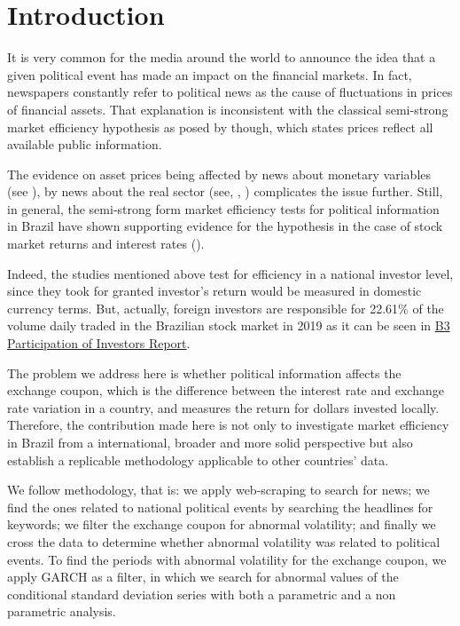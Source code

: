 \documentclass[cic,tc, english]{iiufrgs}
\begin{document}
\tableofcontents


\chapter{Introduction} \label{chapter_introduction}

    It is very common for the media around the world to announce the idea that a given political event has made an impact on the financial markets. In fact, newspapers constantly refer to political news as the cause of fluctuations in prices of financial assets. That explanation is inconsistent with the classical semi-strong market efficiency hypothesis as posed by \citet{fama1970} though, which states prices reflect all available public information.  
    
    The evidence on asset prices being affected by news about monetary variables (see \citet{cornell1983}), by news about the real sector (see, \citet{macqueenroley1993}, \citet{caporaleetal2015}) complicates the issue further. Still, in general, the semi-strong form market efficiency tests for political information in Brazil have shown supporting evidence for the hypothesis in the case of stock market returns and interest rates (\citet{marquessantos2016}).
    
    Indeed, the studies mentioned above test for efficiency in a national investor level, since they took for granted investor's return would be measured in domestic currency terms.  But, actually, foreign investors are responsible for 22.61\% of the volume daily traded in the Brazilian stock market in 2019 as it can be seen in  \href{http://www.b3.com.br/data/files/14/B4/D5/25/4B80B61070D79EA6AC094EA8/partdir_NOVOv2.xls}{B3 Participation of Investors Report}.
    
    The problem we address here is whether political information affects the exchange coupon, which is the difference between the interest rate and exchange rate variation in a country, and measures the return for dollars invested locally. Therefore, the contribution made here is not only to investigate market efficiency in Brazil from a international, broader and more solid perspective but also establish a replicable methodology applicable to other countries' data.
    
    We follow \citet{marquessantos2016} methodology, that is: we apply web-scraping to search for news; we find the ones related to national political events by searching the headlines for keywords; we filter the exchange coupon for abnormal volatility; and finally we cross the data to determine whether abnormal volatility was related to political events. To find the periods with abnormal volatility for the exchange coupon, we apply \citet{bollerslev1986} GARCH as a filter, in which we search for abnormal values of the conditional standard deviation series with both a parametric and a non parametric analysis.
\end{document}
